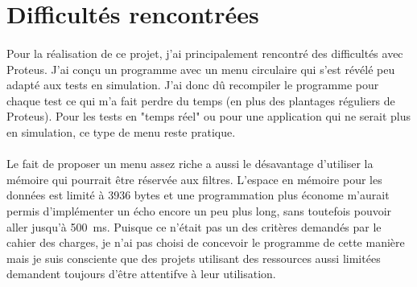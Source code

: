 \documentclass{article}
\begin{document}
    \section{Difficultés rencontrées}
    \paragraph{}
    Pour la réalisation de ce projet, j'ai principalement rencontré des difficultés avec Proteus. J'ai conçu un programme avec un menu circulaire qui s'est révélé peu adapté aux tests en simulation. J'ai donc dû recompiler le programme pour chaque test ce qui m'a fait perdre du temps (en plus des plantages réguliers de Proteus). Pour les tests en "temps réel" ou pour une application qui ne serait plus en simulation, ce type de menu reste pratique.

    \paragraph{}
    Le fait de proposer un menu assez riche a aussi le désavantage d'utiliser la mémoire qui pourrait être réservée aux filtres. L'espace en mémoire pour les données est limité à 3936 bytes et une programmation plus économe m'aurait permis d'implémenter un écho encore un peu plus long, sans toutefois pouvoir aller jusqu'à \SI{500}{\milli\second}. Puisque ce n'était pas un des critères demandés par le cahier des charges, je n'ai pas choisi de concevoir le programme de cette manière mais je suis consciente que des projets utilisant des ressources aussi limitées demandent toujours d'être attentif\textperiodcentered ve à leur utilisation.
\end{document}
